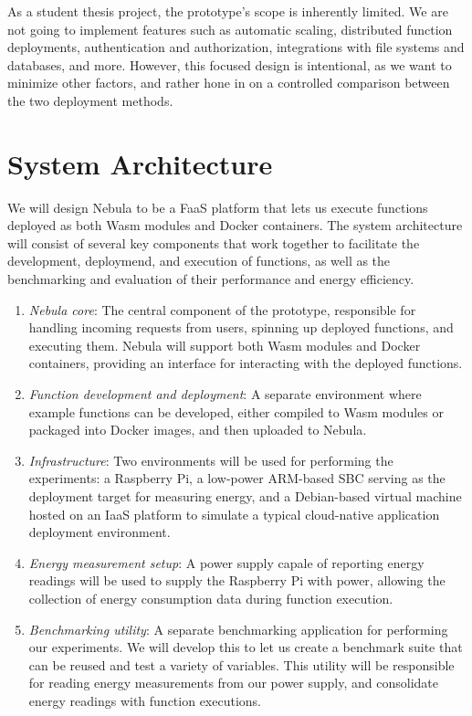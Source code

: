 \documentclass[
  table]{report}
\begin{document}
As a student thesis project, the prototype's scope is inherently
limited. We are not going to implement features such as automatic
scaling, distributed function deployments, authentication and
authorization, integrations with file systems and databases, and more.
However, this focused design is intentional, as we want to minimize
other factors, and rather hone in on a controlled comparison between the
two deployment methods.

\newpage

\section{System Architecture}

We will design Nebula to be a \ac{FaaS} platform that lets us execute
functions deployed as both \ac{Wasm} modules and Docker containers. The
system architecture will consist of several key components that work
together to facilitate the development, deploymend, and execution of
functions, as well as the benchmarking and evaluation of their
performance and energy efficiency.

\begin{enumerate}
\def\labelenumi{\arabic{enumi}.}
\item
  \emph{Nebula core}: The central component of the prototype,
  responsible for handling incoming requests from users, spinning up
  deployed functions, and executing them. Nebula will support both
  \ac{Wasm} modules and Docker containers, providing an interface for
  interacting with the deployed functions.
\item
  \emph{Function development and deployment}: A separate environment
  where example functions can be developed, either compiled to \ac{Wasm}
  modules or packaged into Docker images, and then uploaded to Nebula.
\item
  \emph{Infrastructure}: Two environments will be used for performing
  the experiments: a Raspberry Pi, a low-power ARM-based \ac{SBC}
  serving as the deployment target for measuring energy, and a
  Debian-based virtual machine hosted on an \ac{IaaS} platform to
  simulate a typical cloud-native application deployment environment.
\item
  \emph{Energy measurement setup}: A power supply capale of reporting
  energy readings will be used to supply the Raspberry Pi with power,
  allowing the collection of energy consumption data during function
  execution.
\item
  \emph{Benchmarking utility}: A separate benchmarking application for
  performing our experiments. We will develop this to let us create a
  benchmark suite that can be reused and test a variety of variables.
  This utility will be responsible for reading energy measurements from
  our power supply, and consolidate energy readings with function
  executions.
\end{enumerate}
\end{document}
